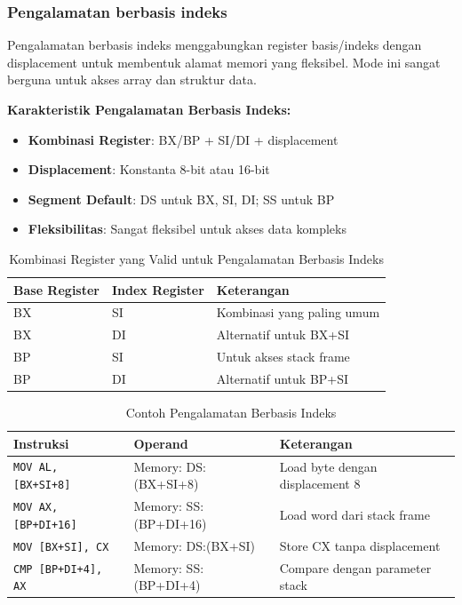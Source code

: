 \documentclass[../main.tex]{subfiles}
\begin{document}
            \subsubsection{Pengalamatan berbasis indeks}
Pengalamatan berbasis indeks menggabungkan register basis/indeks dengan displacement untuk membentuk alamat memori yang fleksibel. Mode ini sangat berguna untuk akses array dan struktur data.

\textbf{Karakteristik Pengalamatan Berbasis Indeks:}
\begin{itemize}
    \item \textbf{Kombinasi Register}: BX/BP + SI/DI + displacement
    \item \textbf{Displacement}: Konstanta 8-bit atau 16-bit
    \item \textbf{Segment Default}: DS untuk BX, SI, DI; SS untuk BP
    \item \textbf{Fleksibilitas}: Sangat fleksibel untuk akses data kompleks
\end{itemize}

\begin{table}[H]
    \centering
    \caption{Kombinasi Register yang Valid untuk Pengalamatan Berbasis Indeks}
    \begin{tabular}{|p{2.8cm}|p{2.8cm}|p{7.8cm}|}
        \hline
        \textbf{Base Register} & \textbf{Index Register} & \textbf{Keterangan} \\
        \hline
        BX & SI & Kombinasi yang paling umum \\
        \hline
        BX & DI & Alternatif untuk BX+SI \\
        \hline
        BP & SI & Untuk akses stack frame \\
        \hline
        BP & DI & Alternatif untuk BP+SI \\
        \hline
    \end{tabular}
    \label{tab:indexed-addressing-combinations}
\end{table}

\begin{table}[H]
    \centering
    \caption{Contoh Pengalamatan Berbasis Indeks}
    \begin{tabular}{|p{3.5cm}|p{3.5cm}|p{6.5cm}|}
        \hline
        \textbf{Instruksi} & \textbf{Operand} & \textbf{Keterangan} \\
        \hline
        \texttt{MOV AL, [BX+SI+8]} & Memory: DS:(BX+SI+8) & Load byte dengan displacement 8 \\
        \hline
        \texttt{MOV AX, [BP+DI+16]} & Memory: SS:(BP+DI+16) & Load word dari stack frame \\
        \hline
        \texttt{MOV [BX+SI], CX} & Memory: DS:(BX+SI) & Store CX tanpa displacement \\
        \hline
        \texttt{CMP [BP+DI+4], AX} & Memory: SS:(BP+DI+4) & Compare dengan parameter stack \\
        \hline
    \end{tabular}
    \label{tab:indexed-addressing-examples}
\end{table}
\end{document}
